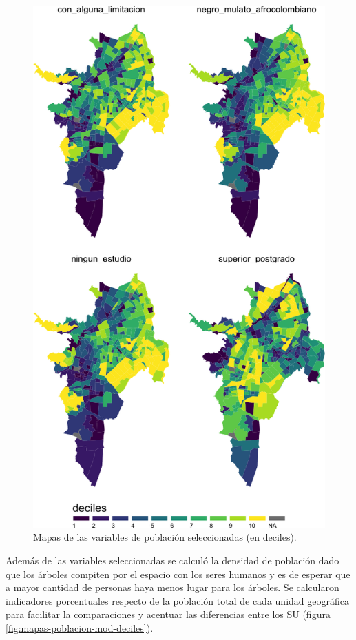 \documentclass[12pt,a4paper,oneside, openany]{book}
\theoremstyle{definition}
\theoremstyle{definition}
\theoremstyle{definition}
\theoremstyle{remark}
\begin{document}
\begin{figure}[p]

{\centering \includegraphics[width=0.7\linewidth]{tesis-unigis_files/figure-latex/mapas-poblacion-deciles-1} 

}

\caption{Mapas de las variables de población seleccionadas (en deciles).}\label{fig:mapas-poblacion-deciles}
\end{figure}

Además de las variables seleccionadas se calculó la densidad de
población dado que los árboles compiten por el espacio con los seres
humanos y es de esperar que a mayor cantidad de personas haya menos
lugar para los árboles. Se calcularon indicadores porcentuales respecto
de la población total de cada unidad geográfica para facilitar la
comparaciones y acentuar las diferencias entre los SU (figura
\ref{fig:mapas-poblacion-mod-deciles}).
\end{document}
